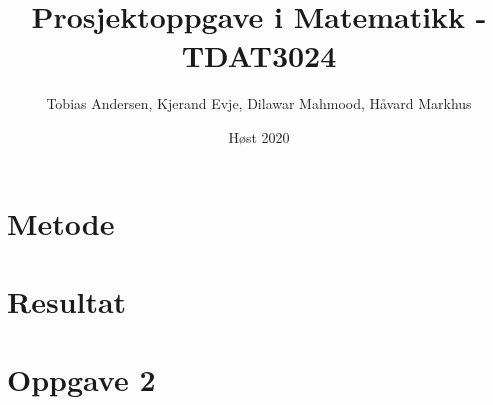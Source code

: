 \documentclass{article}
\title{Prosjektoppgave i Matematikk - TDAT3024}
\author{Tobias Andersen, Kjerand Evje, Dilawar Mahmood, Håvard Markhus}
\date{Høst 2020}
\begin{document}
\maketitle
\newpage
\tableofcontents
\newpage

\section{Metode}


\section{Resultat}






\section*{Oppgave 2}


\newpage

 

\end{document}
